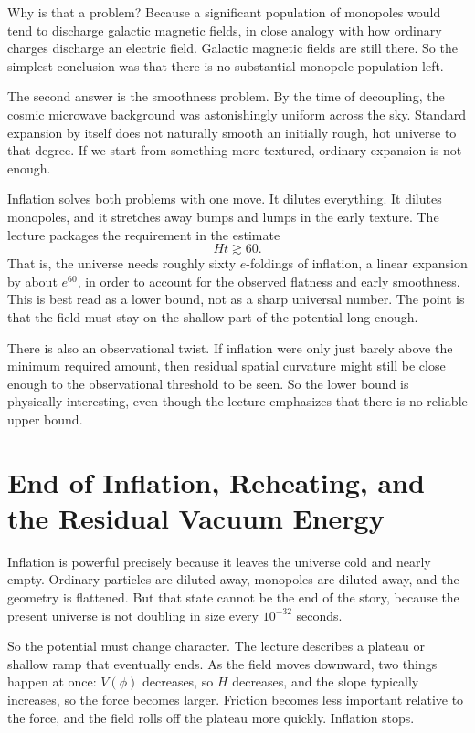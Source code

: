 Why is that a problem? Because a significant population of monopoles would tend to discharge galactic magnetic fields, in close analogy with how ordinary charges discharge an electric field. Galactic magnetic fields are still there. So the simplest conclusion was that there is no substantial monopole population left.

The second answer is the smoothness problem. By the time of decoupling, the cosmic microwave background was astonishingly uniform across the sky. Standard expansion by itself does not naturally smooth an initially rough, hot universe to that degree. If we start from something more textured, ordinary expansion is not enough.

Inflation solves both problems with one move. It dilutes everything. It dilutes monopoles, and it stretches away bumps and lumps in the early texture. The lecture packages the requirement in the estimate
\begin{equation}
Ht\gtrsim 60.
\end{equation}
That is, the universe needs roughly sixty \(e\)-foldings of inflation, a linear expansion by about \(e^{60}\), in order to account for the observed flatness and early smoothness. This is best read as a lower bound, not as a sharp universal number. The point is that the field must stay on the shallow part of the potential long enough.

There is also an observational twist. If inflation were only just barely above the minimum required amount, then residual spatial curvature might still be close enough to the observational threshold to be seen. So the lower bound is physically interesting, even though the lecture emphasizes that there is no reliable upper bound.

\section{End of Inflation, Reheating, and the Residual Vacuum Energy}

Inflation is powerful precisely because it leaves the universe cold and nearly empty. Ordinary particles are diluted away, monopoles are diluted away, and the geometry is flattened. But that state cannot be the end of the story, because the present universe is not doubling in size every \(10^{-32}\) seconds.

So the potential must change character. The lecture describes a plateau or shallow ramp that eventually ends. As the field moves downward, two things happen at once: \(V(\phi)\) decreases, so \(H\) decreases, and the slope typically increases, so the force becomes larger. Friction becomes less important relative to the force, and the field rolls off the plateau more quickly. Inflation stops.

